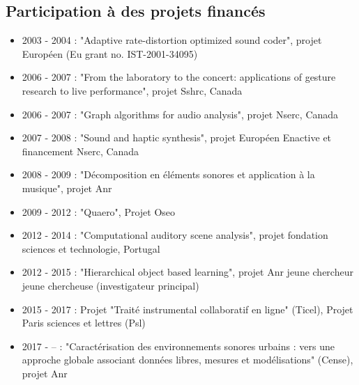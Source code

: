 \subsection{Participation à des projets financés}
\begin{itemize}
\item 2003 - 2004 : "Adaptive rate-distortion optimized sound coder", projet Européen (Eu grant no. IST-2001-34095)
\item 2006 - 2007 : "From the laboratory to the concert: applications of gesture research to live performance", projet Sshrc, Canada
\item 2006 - 2007 : "Graph algorithms for audio analysis", projet Nserc, Canada
\item 2007 - 2008 : "Sound and haptic synthesis", projet Européen Enactive et financement Nserc, Canada
\item 2008 - 2009 : "Décomposition en éléments sonores et application à la musique", projet Anr
\item 2009 - 2012 : "Quaero", Projet Oseo
\item 2012 - 2014 : "Computational auditory scene analysis", projet fondation sciences et technologie, Portugal
\item 2012 - 2015 : "Hierarchical object based learning", projet Anr jeune chercheur jeune chercheuse (investigateur principal)
\item 2015 - 2017 : Projet "Traité instrumental collaboratif en ligne" (Ticel), Projet Paris sciences et lettres (Psl)
\item 2017 - -- : "Caractérisation des environnements sonores urbains : vers une approche globale associant données libres, mesures et modélisations" (Cense), projet Anr
\end{itemize}

